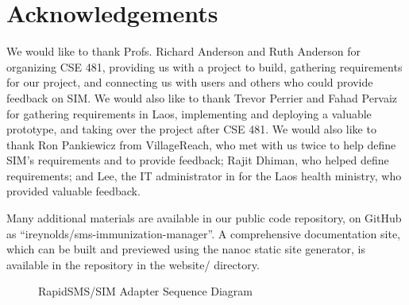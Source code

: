 \documentclass{acm_proc_article-sp}
\begin{document}
\section{Acknowledgements}

We would like to thank Profs. Richard Anderson and Ruth Anderson for organizing CSE 481, providing us with a project to build, gathering requirements for our project, and connecting us with users and others who could provide feedback on SIM. We would also like to thank Trevor Perrier and Fahad Pervaiz for gathering requirements in Laos, implementing and deploying a valuable prototype, and taking over the project after CSE 481. We would also like to thank Ron Pankiewicz from VillageReach, who met with us twice to help define SIM's requirements and to provide feedback; Rajit Dhiman, who helped define requirements; and Lee, the IT administrator in for the Laos health ministry, who provided valuable feedback.


  
\balancecolumns

\appendix
Many additional materials are available in our public code repository, on GitHub as ``ireynolds/sms-immunization-manager''. A comprehensive documentation site, which can be built and previewed using the nanoc static site generator, is available in the repository in the website/ directory.

\begin{figure*}
\centering
{}
\caption{RapidSMS/SIM Adapter Sequence Diagram}
\end{figure*}
\end{document}
